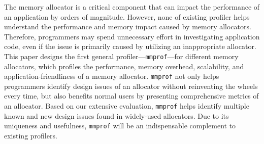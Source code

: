 The memory allocator is a critical component that can impact the performance of an application by orders of magnitude. However, none of existing profiler helps understand the performance and memory impact caused by memory allocators. Therefore, programmers may spend unnecessary effort in investigating application code, even if the  issue is primarily caused by utilizing an inappropriate allocator. This paper designs the first general profiler---\texttt{mmprof}---for different memory allocators, which profiles the performance, memory overhead, scalability, and application-friendliness of a memory allocator. \texttt{mmprof} not only helps programmers identify design issues of an allocator without reinventing the wheels every time, but also benefits normal users by presenting comprehensive metrics of an allocator. Based on our extensive evaluation, \texttt{mmprof} helps identify multiple known and new design issues found in widely-used allocators. 
Due to its uniqueness and usefulness, \texttt{mmprof} will be an indispensable complement to existing profilers. 


 